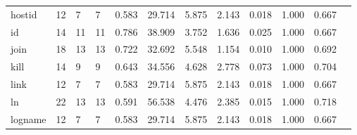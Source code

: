 \begin{longtable}{lp{1.00cm}p{1.00cm}p{1.00cm}p{1.00cm}p{1.00cm}p{1.00cm}p{1.00cm}p{1.00cm}p{1.00cm}p{1.00cm}p{1.00cm}}
hostid    &                           12 &                  7 &                                 7 &                                      0.583 &                                 29.714 &                                        5.875 &                             2.143 &                                   0.018 &                        1.000 &                                        0.667 \\
id        &                           14 &                 11 &                                11 &                                      0.786 &                                 38.909 &                                        3.752 &                             1.636 &                                   0.025 &                        1.000 &                                        0.667 \\
join      &                           18 &                 13 &                                13 &                                      0.722 &                                 32.692 &                                        5.548 &                             1.154 &                                   0.010 &                        1.000 &                                        0.692 \\
kill      &                           14 &                  9 &                                 9 &                                      0.643 &                                 34.556 &                                        4.628 &                             2.778 &                                   0.073 &                        1.000 &                                        0.704 \\
link      &                           12 &                  7 &                                 7 &                                      0.583 &                                 29.714 &                                        5.875 &                             2.143 &                                   0.018 &                        1.000 &                                        0.667 \\
ln        &                           22 &                 13 &                                13 &                                      0.591 &                                 56.538 &                                        4.476 &                             2.385 &                                   0.015 &                        1.000 &                                        0.718 \\
logname   &                           12 &                  7 &                                 7 &                                      0.583 &                                 29.714 &                                        5.875 &                             2.143 &                                   0.018 &                        1.000 &                                        0.667 \\

\end{longtable}
